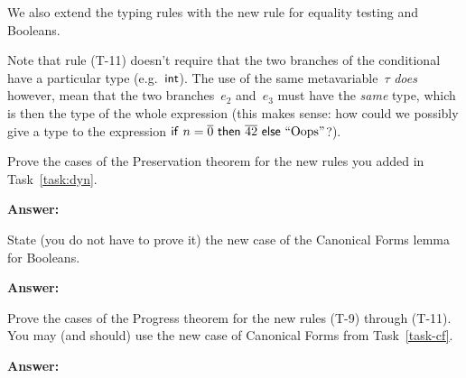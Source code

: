 \documentclass{article}
\begin{document}
We also extend the typing rules with the new rule for equality testing and
Booleans.

{
  \centering
  \def \MathparLineskip {\lineskip=0.43cm}
}

Note that rule (T-11) doesn't require that the two branches of the conditional
have a particular type (e.g.~$\mathsf{int}$).
%
The use of the same metavariable~$\tau$ {\em does} however, mean that the
two branches~$e_2$ and~$e_3$ must have the {\em same} type, which is then the
type of the whole expression
(this makes sense: how could we possibly give a type to the expression
$\mathsf{if}~n = \overline{0}~\mathsf{then}~\overline{42}~\mathsf{else}~\text{``}\text{Oops}\text{''}$?).

\begin{task}
  Prove the cases of the Preservation theorem for the new rules you
  added in Task~\ref{task:dyn}.
\end{task}

\textbf{Answer:}

\begin{task}\label{task-cf}
  State (you do not have to prove it) the new case of the Canonical Forms
  lemma for Booleans.
\end{task}

\textbf{Answer:}

\begin{task}
  Prove the cases of the Progress theorem for the new rules
  (T-9) through (T-11). You may (and should) use the new case of Canonical
  Forms from Task~\ref{task-cf}.
\end{task}

\textbf{Answer:}
\end{document}
